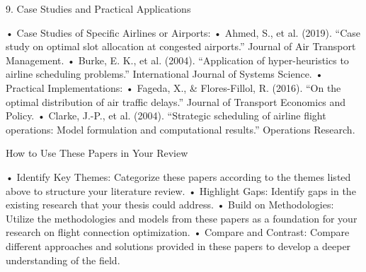 9. Case Studies and Practical Applications

	•	Case Studies of Specific Airlines or Airports:
	•	Ahmed, S., et al. (2019). “Case study on optimal slot allocation at congested airports.” Journal of Air Transport Management.
	•	Burke, E. K., et al. (2004). “Application of hyper-heuristics to airline scheduling problems.” International Journal of Systems Science.
	•	Practical Implementations:
	•	Fageda, X., & Flores-Fillol, R. (2016). “On the optimal distribution of air traffic delays.” Journal of Transport Economics and Policy.
	•	Clarke, J.-P., et al. (2004). “Strategic scheduling of airline flight operations: Model formulation and computational results.” Operations Research.

How to Use These Papers in Your Review

	•	Identify Key Themes: Categorize these papers according to the themes listed above to structure your literature review.
	•	Highlight Gaps: Identify gaps in the existing research that your thesis could address.
	•	Build on Methodologies: Utilize the methodologies and models from these papers as a foundation for your research on flight connection optimization.
	•	Compare and Contrast: Compare different approaches and solutions provided in these papers to develop a deeper understanding of the field.
